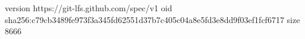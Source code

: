 version https://git-lfs.github.com/spec/v1
oid sha256:c79cb3489fe973f3a345fd62551d37b7c405c04a8e5fd3e8dd9f03ef1fcf6717
size 8666
